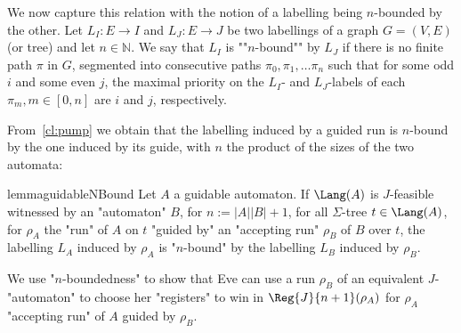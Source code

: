 \documentclass[a4paper,UKenglish,cleveref, autoref, thm-restate]{lipics-v2021}
\newcommand{\NN}{\mathbb{N}}
\begin{document}
\AP We now capture this relation with the notion of a labelling being $n$-bounded by the other. Let $L_I: E\rightarrow I$ and $L_J:E\rightarrow J$ be two labellings of a graph $G= (V,E)$ (or tree) and let $n \in \NN$. We say that $L_I$ is ""$n$-bound"" by $L_J$ if there is no finite path $\pi$ in $G$, segmented into consecutive paths $\pi_0,\pi_1,\dots \pi_n$ such that for some odd $i$ and some even $j$, the maximal priority on the $L_I$- and $L_J$-labels of each $\pi_m, m\in [0,n]$ are $i$ and $j$, respectively.

From~\cref{cl:pump} we obtain that the labelling induced by a guided run is $n$-bound by the one induced by its guide, with $n$ the product of the sizes of the two automata:

\begin{restatable}{lemma}{guidableNBound}\label{lem:guidable-n-bound}
	Let $A$ a guidable automaton. If $\Lang(A)$ is $J$-feasible witnessed by an "automaton" $B$, for $n := |A| |B|+1$, for all $\Sigma$-tree $t \in \Lang(A)$, for $\rho_A$ the "run" of $A$ on $t$ "guided by" an "accepting run" $\rho_B$ of $B$ over $t$, the labelling $L_A$ induced by $\rho_A$ is "$n$-bound" by the labelling $L_B$ induced by $\rho_B$.
\end{restatable}



We use "$n$-boundedness" to show that Eve can use a run $\rho_B$ of an equivalent $J$-"automaton" to choose her "registers" to win in $\Reg{J}{n+1}(\rho_A)$ for $\rho_A$ "accepting run" of $A$ guided by $\rho_B$.
\end{document}
